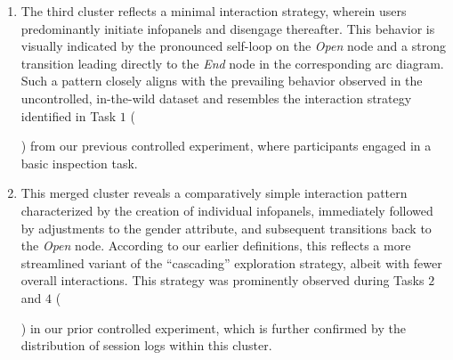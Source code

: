 \documentclass[preprint,journal]{vgtc}            %
\newcommand{\px}{0.0104167in} %
\begin{document}
\begin{enumerate}[noitemsep, topsep=0pt, parsep=0pt ,leftmargin=*]
    \item The third cluster reflects a minimal interaction strategy, wherein users predominantly initiate infopanels and disengage thereafter.
    This behavior is visually indicated by the pronounced self-loop on the \textit{Open} node and a strong transition leading directly to the \textit{End} node in the corresponding arc diagram.
    Such a pattern closely aligns with the prevailing behavior observed in the uncontrolled, in-the-wild dataset and resembles the interaction strategy identified in Task $1$ (  ) from our previous controlled experiment, where participants engaged in a basic inspection task.

    \item 
    This merged cluster reveals a comparatively simple interaction pattern characterized by the creation of individual infopanels, immediately followed by adjustments to the gender attribute, and subsequent transitions back to the \textit{Open} node. 
    According to our earlier definitions, this reflects a more streamlined variant of the ``cascading'' exploration strategy, albeit with fewer overall interactions. 
    This strategy was prominently observed during Tasks $2$ and $4$ (   ) in our prior controlled experiment, which is further confirmed by the distribution of session logs within this cluster.


\end{enumerate}
\end{document}
